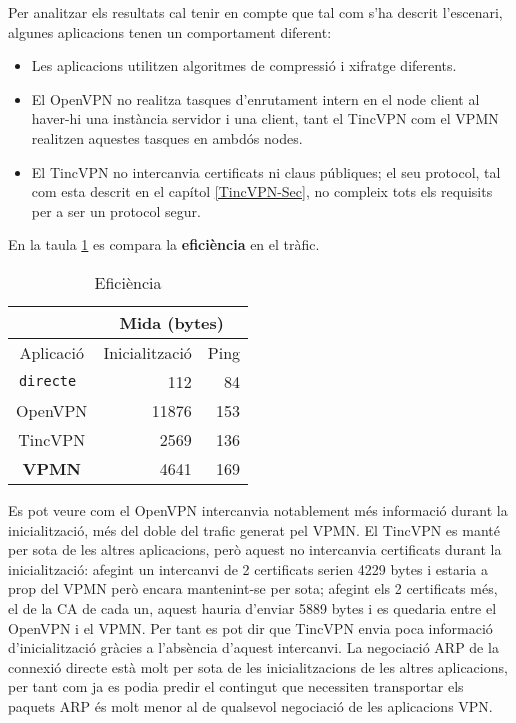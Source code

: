 Per analitzar els resultats cal tenir en compte que tal com s'ha descrit l'escenari, algunes aplicacions tenen un comportament diferent:
\begin{itemize}
\item Les aplicacions utilitzen algoritmes de compressió i xifratge diferents.
\item El OpenVPN no realitza tasques d'enrutament intern en el node client al haver-hi una instància servidor i una client, tant el TincVPN com el VPMN realitzen aquestes tasques en ambdós nodes.
\item El TincVPN no intercanvia certificats ni claus públiques; el seu protocol, tal com esta descrit en el capítol \ref{TincVPN-Sec}, no compleix tots els requisits per a ser un protocol segur.
\end{itemize}

En la taula \ref{T:efi} es compara la \textbf{eficiència} en el tràfic.
\begin{table}[htb]
\begin{center}
\begin{tabular}{|c|r|r|}
\multicolumn{1}{c}{} & \multicolumn{2}{|c|}{Mida (bytes)} \\ \hline
Aplicació & Inicialització & Ping \\ \hline \hline
\tt directe & 112 & 84 \\ \hline
OpenVPN & 11876 & 153 \\ \hline
TincVPN & 2569 & 136 \\ \hline
\bf VPMN & 4641 & 169 \\ \hline
\end{tabular}
\end{center}
\begin{center}
\caption{Eficiència}
\label{T:efi}
\end{center}
\end{table}
Es pot veure com el OpenVPN intercanvia notablement més informació durant la inicialització, més del doble del trafic generat pel VPMN.
El TincVPN es manté per sota de les altres aplicacions, però aquest no intercanvia certificats durant la inicialització: afegint un intercanvi de 2 certificats serien 4229 bytes i estaria a prop del VPMN però encara mantenint-se per sota; afegint els 2 certificats més, el de la CA de cada un, aquest hauria d'enviar 5889 bytes i es quedaria entre el OpenVPN i el VPMN. Per tant es pot dir que TincVPN envia poca informació d'inicialització gràcies a l'absència d'aquest intercanvi.
La negociació ARP de la connexió directe està molt per sota de les inicialitzacions de les altres aplicacions, per tant com ja es podia predir el contingut que necessiten transportar els paquets ARP és molt menor al de qualsevol negociació de les aplicacions VPN.


